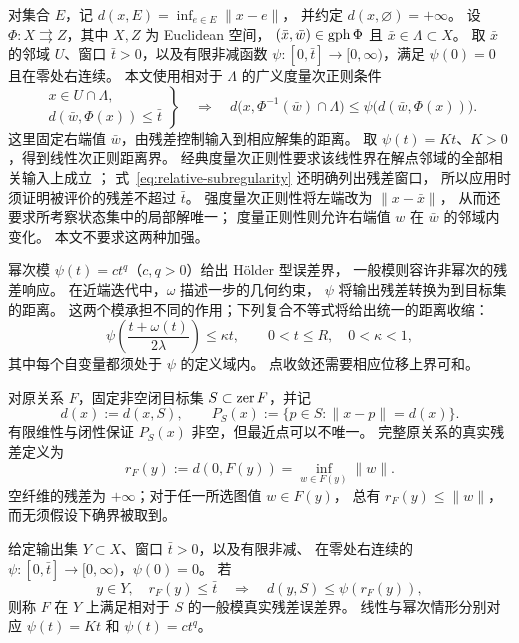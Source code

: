 对集合 $E$，记 $d(x,E)=\inf_{e\in E}\|x-e\|$，
并约定 $d(x,\varnothing)=+\infty$。
设 $\Phi:X\rightrightarrows Z$，其中 $X,Z$ 为 Euclidean 空间，
$(\bar x,\bar w)\in\operatorname{gph}\Phi$ 且 $\bar x\in\Lambda\subset X$。
取 $\bar x$ 的邻域 $U$、窗口 $\bar t>0$，以及有限非减函数
$\psi:[0,\bar t]\to[0,\infty)$，满足 $\psi(0)=0$ 且在零处右连续。
本文使用相对于 $\Lambda$ 的广义度量次正则条件
\begin{equation}
 \left.
 \begin{gathered}
 x\in U\cap\Lambda,\\
 d(\bar w,\Phi(x))\le\bar t
 \end{gathered}
 \right\}
 \quad\Longrightarrow\quad
 d\bigl(x,\Phi^{-1}(\bar w)\cap\Lambda\bigr)
 \le\psi\bigl(d(\bar w,\Phi(x))\bigr).
 \label{eq:relative-subregularity}
\end{equation}
这里固定右端值 $\bar w$，由残差控制输入到相应解集的距离。
取 $\psi(t)=Kt$、$K>0$，得到线性次正则距离界。
经典度量次正则性要求该线性界在解点邻域的全部相关输入上成立
\cite[Definition~1]{LukeTam2025GeneralizedMonotonicity}；
式~\eqref{eq:relative-subregularity} 还明确列出残差窗口，
所以应用时须证明被评价的残差不超过 $\bar t$。
强度量次正则性将左端改为 $\|x-\bar x\|$，
从而还要求所考察状态集中的局部解唯一；
度量正则性则允许右端值 $w$ 在 $\bar w$ 的邻域内变化。
本文不要求这两种加强。

幂次模 $\psi(t)=ct^q$（$c,q>0$）给出 H\"older 型误差界，
一般模则容许非幂次的残差响应。
在近端迭代中，$\omega$ 描述一步的几何约束，
$\psi$ 将输出残差转换为到目标集的距离。
这两个模承担不同的作用；下列复合不等式将给出统一的距离收缩：
\[
 \psi\!\left(\frac{t+\omega(t)}{2\lambda}\right)\le\kappa t,
 \qquad 0<t\le R,\quad 0<\kappa<1,
\]
其中每个自变量都须处于 $\psi$ 的定义域内。
点收敛还需要相应位移上界可和。

对原关系 $F$，固定非空闭目标集 $S\subset\operatorname{zer} F$，并记
\[
 d(x):=d(x,S),\qquad
 P_S(x):=\{p\in S:\|x-p\|=d(x)\}.
\]
有限维性与闭性保证 $P_S(x)$ 非空，但最近点可以不唯一。
完整原关系的真实残差定义为
\[
 r_F(y):=d(0,F(y))=\inf_{w\in F(y)}\|w\|.
\]
空纤维的残差为 $+\infty$；对于任一所选图值 $w\in F(y)$，
总有 $r_F(y)\le\|w\|$，而无须假设下确界被取到。

\begin{definition}[一般模真实残差误差界]
\label{def:true-EB}
\label{def:admissible-gauge}
给定输出集 $Y\subset X$、窗口 $\bar t>0$，以及有限非减、
在零处右连续的 $\psi:[0,\bar t]\to[0,\infty)$，$\psi(0)=0$。
若
\begin{equation}
 y\in Y,\quad r_F(y)\le\bar t
 \quad\Longrightarrow\quad
 d(y,S)\le\psi(r_F(y)),
 \label{eq:gauge-EB}
\end{equation}
则称 $F$ 在 $Y$ 上满足相对于 $S$ 的一般模真实残差误差界。
线性与幂次情形分别对应 $\psi(t)=Kt$ 和 $\psi(t)=ct^q$。
\end{definition}

